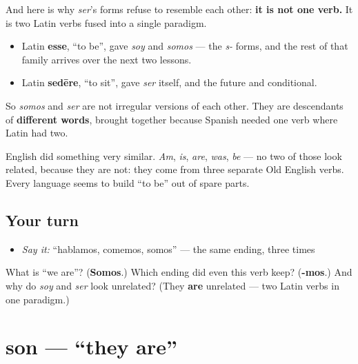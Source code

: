 \begin{cousinweb}
And here is why \emph{ser}'s forms refuse to resemble each other: \textbf{it is not one verb.} It is two Latin verbs fused into a single paradigm.

\begin{itemize}
\raggedright
  \item Latin \textbf{esse}, \textquotedblleft{}to be\textquotedblright{}, gave \emph{soy} and \emph{somos} — the \emph{s-} forms, and the rest of that family arrives over the next two lessons.
  \item Latin \textbf{sedēre}, \textquotedblleft{}to sit\textquotedblright{}, gave \emph{ser} itself, and the future and conditional.
\end{itemize}

So \emph{somos} and \emph{ser} are not irregular versions of each other. They are descendants of \textbf{different words}, brought together because Spanish needed one verb where Latin had two.

English did something very similar. \emph{Am}, \emph{is}, \emph{are}, \emph{was}, \emph{be} — no two of those look related, because they are not: they come from three separate Old English verbs. Every language seems to build \textquotedblleft{}to be\textquotedblright{} out of spare parts.
\end{cousinweb}

\subsection*{Your turn}
\begin{itemize}
\raggedright
  \item \emph{Say it:} \textquotedblleft{}hablamos, comemos, somos\textquotedblright{} — the same ending, three times
\end{itemize}

\begin{tcolorbox}[breakable,colback=teal!4,colframe=teal!35!black,title={Before you move on}]
What is \textquotedblleft{}we are\textquotedblright{}? (\textbf{Somos}.) Which ending did even this verb keep? (\textbf{-mos}.) And why do \emph{soy} and \emph{ser} look unrelated? (They \textbf{are} unrelated — two Latin verbs in one paradigm.)
\end{tcolorbox}
\section[son]{son — \textquotedblleft{}they are\textquotedblright{}}

